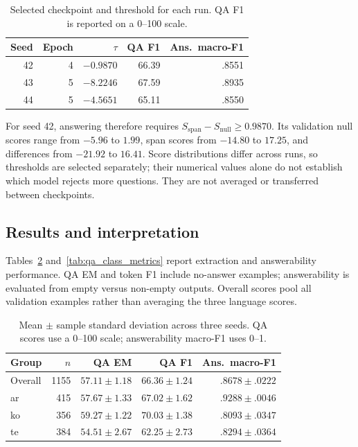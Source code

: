 \documentclass[11pt,a4paper]{article}
\begin{document}
\begin{table}[t]
\centering
\small
\begin{tabular}{rrrrr}
\toprule
Seed & Epoch & $\tau$ & QA F1 & Ans.\ macro-F1 \\
\midrule
42 & 4 & $-0.9870$ & 66.39 & .8551 \\
43 & 5 & $-8.2246$ & 67.59 & .8935 \\
44 & 5 & $-4.5651$ & 65.11 & .8550 \\
\bottomrule
\end{tabular}
\caption{Selected checkpoint and threshold for each run.
QA F1 is reported on a 0--100 scale.}
\label{tab:qa_selection}
\end{table}

For seed 42, answering therefore requires
$S_{\mathrm{span}}-S_{\mathrm{null}}\geq0.9870$.
Its validation null scores range from $-5.96$ to $1.99$,
span scores from $-14.80$ to $17.25$, and differences from
$-21.92$ to $16.41$. Score distributions differ across runs,
so thresholds are selected separately; their numerical values
alone do not establish which model rejects more questions.
They are not averaged or transferred between checkpoints.

\subsection{Results and interpretation}
Tables~\ref{tab:qa_results} and~\ref{tab:qa_class_metrics}
report extraction and answerability performance. QA EM and token F1 include no-answer examples;
answerability is evaluated from empty versus non-empty outputs.
Overall scores pool all validation examples rather than
averaging the three language scores.

\begin{table}[t]
\centering
\small
\setlength{\tabcolsep}{5pt}
\begin{tabular}{lrrrr}
\toprule
Group & $n$ & QA EM & QA F1 & Ans.\ macro-F1 \\
\midrule
Overall & 1155
& $57.11\pm1.18$ & $66.36\pm1.24$ & $.8678\pm.0222$ \\
ar & 415
& $57.67\pm1.33$ & $67.02\pm1.62$ & $.9288\pm.0046$ \\
ko & 356
& $59.27\pm1.22$ & $70.03\pm1.38$ & $.8093\pm.0347$ \\
te & 384
& $54.51\pm2.67$ & $62.25\pm2.73$ & $.8294\pm.0364$ \\
\bottomrule
\end{tabular}
\caption{Mean $\pm$ sample standard deviation across three seeds.
QA scores use a 0--100 scale; answerability macro-F1 uses 0--1.}
\label{tab:qa_results}
\end{table}
\end{document}
